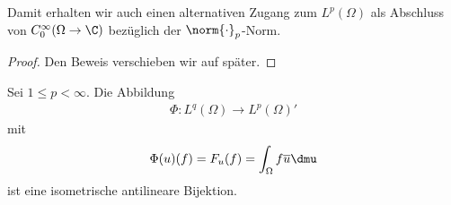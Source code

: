 Damit erhalten wir auch einen alternativen Zugang zum $L^p(\Omega)$ als
Abschluss von $C_0^\infty(\Omega\to\C)$ bezüglich der $\norm{\cdot}_p$-Norm.

\begin{proof}
Den Beweis verschieben wir auf später.\qedhere
\end{proof}

\begin{prop}
Sei $1\le p < \infty$. Die Abbildung
\begin{align*}
\Phi : L^q(\Omega)\to L^p(\Omega)'
\end{align*}
mit
\begin{align*}
\Phi(u)(f) = F_u(f) = \int_\Omega f\overline{u}\dmu
\end{align*}
ist eine isometrische antilineare Bijektion.\fishhere
\end{prop}


